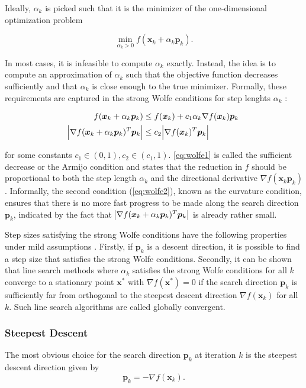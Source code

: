 Ideally, $\alpha_k$ is picked such that it is the minimizer of the one-dimensional optimization problem

\[
    \min_{\alpha_k > 0} f(\bm{x}_k + \alpha_k \bm{p}_k).
\]

\noindent In most cases, it is infeasible to compute $\alpha_k$ exactly. Instead, the idea is to compute an approximation of $\alpha_k$ such that 
the objective function decreases sufficiently and that $\alpha_k$ is close enough to the true minimizer. Formally, these requirements
are captured in the strong Wolfe conditions for step lenghts $\alpha_k$ \cite{nocedal2006}:

\begin{align}
    f(\bm{x}_k + \alpha_k \bm{p}_k) &\leq f(\bm{x}_k) + c_1 \alpha_k \nabla f(\bm{x}_k) \bm{p}_k \label{eq:wolfe1} \\
    \abs{\nabla f(\bm{x}_k + \alpha_k \bm{p}_k)^T \bm{p}_k} &\leq c_2 \abs{\nabla f(\bm{x}_k)^T \bm{p}_k} \label{eq:wolfe2}
\end{align}

\noindent for some constants $c_1 \in (0, 1), c_2 \in (c_1, 1)$. \cref{eq:wolfe1} is called the sufficient decrease or the Armijo condition 
and states that the reduction in $f$ should be proportional to both the step length $\alpha_k$ and the directional derivative 
$\nabla f(\bm{x}_k \bm{p}_k)$. Informally, the second condition (\cref{eq:wolfe2}), known as the curvature condition, ensures that there 
is no more fast 
progress to be made along the search direction $\bm{p}_k$, indicated by the fact that $\abs{\nabla f(\bm{x}_k + \alpha_k \bm{p}_k)^T 
\bm{p}_k}$ is already rather small. 

Step sizes satisfying the strong Wolfe conditions have the following properties under mild assumptions \cite{nocedal2006}. Firstly, 
if $\bm{p}_k$ is a descent direction, it is possible to find a step size that satisfies the strong Wolfe conditions. Secondly, it 
can be shown that line search methods where $\alpha_k$ satisfies the strong Wolfe conditions for all $k$ converge to a stationary
point $\bm{x}^*$ with $\nabla f(\bm{x}^*) = 0$ if the search direction $\bm{p}_k$ is sufficiently far from orthogonal to the steepest
descent direction $\nabla f(\bm{x}_k)$ for all $k$. Such line search algorithms are called globally convergent.

\subsubsection{Steepest Descent}\label{sss:steepest-descent}
The most obvious choice for the search direction $\bm{p}_k$ at iteration $k$ is the steepest descent direction given by 
\[
    \bm{p}_k = -\nabla f(\bm{x}_k).
\]

